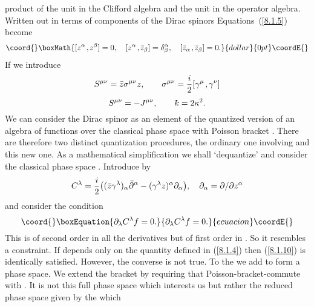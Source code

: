 \documentclass[a4paper,12pt]{article}
\def\p{\partial}
\def\t#1{\tilde #1}
\def\kbar{{\mathchar'26\mkern-9muk}}
\def\t#1{\tilde #1}
\def\k{\kern-.1em\mathbin{,}\kern-.1em}
\begin{document}
product of the unit in the Clifford algebra and the unit in the
operator algebra.  Written out in terms of components of the Dirac
spinors Equations~(\ref{8.1.5}) become
$$\coord{}\boxMath{
[ z^\alpha\k z^\beta] = 0, \quad 
[z^\alpha\k \bar z_\beta ] = \delta^\alpha_\beta, \quad 
[\bar z_\alpha\k \bar z_\beta ] = 0. 
}{dollar}{0pt}\coordE{}$$
If we introduce
$$
S^{\mu\nu} = \bar z \sigma^{\mu\nu} z, \qquad 
\sigma^{\mu\nu} = {i\over 2} [\gamma^{\mu}\k \gamma^{\nu}]     %
$$\coord{}\coordE{}$$
S^{\mu\nu} = - J^{\mu\nu},\qquad \kbar  = 2 \kappa^2.     %
$$ 
We can consider the Dirac spinor as an element of the quantized
version of an algebra of functions over the classical phase space 
\myHighlight{$(z\k \bar z)$}\coordHE{} with Poisson bracket \myHighlight{$\{ z\k \bar z \} = i$}\coordHE{}. There are
therefore two distinct quantization procedures, the
ordinary one involving \myHighlight{$\hbar$}\coordHE{} and this new one. As a mathematical
simplification we shall `dequantize' \coordHE{} and consider the classical
phase space \myHighlight{$(z\k \bar z)$}\coordHE{}. Introduce \coordHE{} by
$$
C^\lambda = {i\over 2} 
\big(( \bar z \gamma^\lambda)_\alpha \bar \p^\alpha 
  - (\gamma^\lambda z )^\alpha \p_\alpha \big),  \quad 
\p_\alpha = \p /\p z^\alpha                              %
$$
and consider the condition
\begin{equation}\coord{}\boxEquation{
\p_{\lambda} C^{\lambda} f = 0.                        \label{8.1.10}
}{
\p_{\lambda} C^{\lambda} f = 0.                        }{ecuacion}\coordE{}\end{equation}
This is of second order in all the derivatives but of first order in
\myHighlight{$\p_{\lambda}$}\coordHE{}. So it resembles a constraint. If \coordHE{} depends
only on the quantity \coordHE{} defined in (\ref{8.1.4}) then
(\ref{8.1.10}) is identically satisfied. However, the converse is not
true. To the \myHighlight{$(\t{x}^{\mu}, z, \bar z)$}\coordHE{} we add \coordHE{} to form a phase
space. We extend the bracket by requiring that
\myHighlight{$(p_{\lambda}, \t{x}^{\mu})$}\coordHE{} Poisson-bracket-commute with \coordHE{}. It
is not this full phase space which interests us but rather the reduced
phase space given by the \coordHE{} which
\end{document}
